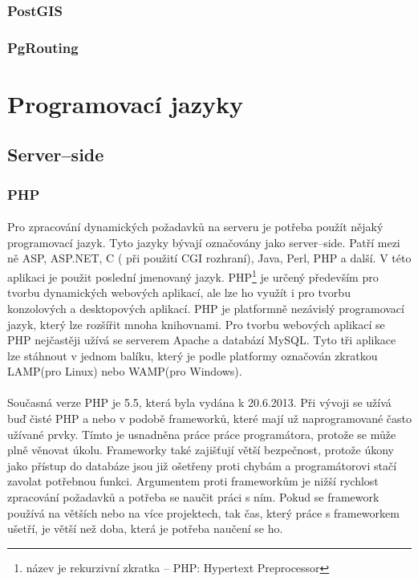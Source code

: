 \documentclass[11pt,a4paper,titlepage,oneside]{book}
\begin{document}
			\subsubsection{PostGIS}
				\paragraph{}
			\subsubsection{PgRouting}
				\paragraph{}

	\section{Programovací jazyky}
		\subsection{Server--side}
			\subsubsection{PHP}
				\paragraph{} Pro zpracování dynamických požadavků na serveru je potřeba použít nějaký programovací jazyk. Tyto jazyky bývají označovány jako server--side. Patří mezi ně ASP, ASP.NET, C ( při použití CGI rozhraní), Java, Perl, PHP a další. V této aplikaci je použit poslední jmenovaný jazyk. PHP\footnote{název je rekurzivní zkratka -- PHP: Hypertext Preprocessor} je určený především pro tvorbu dynamických webových aplikací, ale lze ho využít i pro tvorbu konzolových a desktopových aplikací. PHP je platformně nezávislý programovací jazyk, který lze rozšířit mnoha knihovnami. Pro tvorbu webových aplikací se PHP nejčastěji užívá se serverem Apache a databází MySQL. Tyto tři aplikace lze stáhnout v jednom balíku, který je podle platformy označován zkratkou LAMP(pro Linux) nebo WAMP(pro Windows).
				\paragraph{} Současná verze PHP je 5.5, která byla vydána k 20.6.2013. Při vývoji se užívá buď čisté PHP a nebo v podobě frameworků, které mají už naprogramované často užívané prvky. Tímto je usnadněna práce práce programátora, protože se může plně věnovat úkolu. Frameworky také zajišťují větší bezpečnost, protože úkony jako přístup do databáze jsou již ošetřeny proti chybám a programátorovi stačí zavolat potřebnou funkci. Argumentem proti frameworkům je nižší rychlost zpracování požadavků a potřeba se naučit práci s ním. Pokud se framework používá na větších nebo na více projektech, tak čas, který práce s frameworkem ušetří, je větší než doba, která je potřeba naučení se ho.
\end{document}
